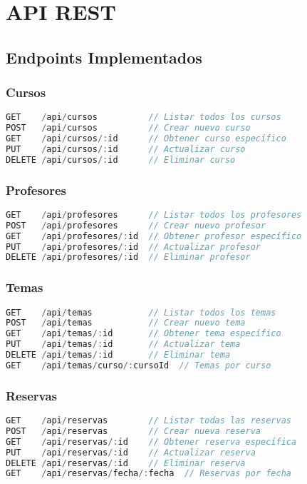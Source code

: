 \documentclass[12pt,a4paper]{article}
\begin{document}
\section{API REST}

\subsection{Endpoints Implementados}

\subsubsection{Cursos}
\begin{lstlisting}[language=JavaScript]
GET    /api/cursos          // Listar todos los cursos
POST   /api/cursos          // Crear nuevo curso
GET    /api/cursos/:id      // Obtener curso específico
PUT    /api/cursos/:id      // Actualizar curso
DELETE /api/cursos/:id      // Eliminar curso
\end{lstlisting}

\subsubsection{Profesores}
\begin{lstlisting}[language=JavaScript]
GET    /api/profesores      // Listar todos los profesores
POST   /api/profesores      // Crear nuevo profesor
GET    /api/profesores/:id  // Obtener profesor específico
PUT    /api/profesores/:id  // Actualizar profesor
DELETE /api/profesores/:id  // Eliminar profesor
\end{lstlisting}

\subsubsection{Temas}
\begin{lstlisting}[language=JavaScript]
GET    /api/temas           // Listar todos los temas
POST   /api/temas           // Crear nuevo tema
GET    /api/temas/:id       // Obtener tema específico
PUT    /api/temas/:id       // Actualizar tema
DELETE /api/temas/:id       // Eliminar tema
GET    /api/temas/curso/:cursoId  // Temas por curso
\end{lstlisting}

\subsubsection{Reservas}
\begin{lstlisting}[language=JavaScript]
GET    /api/reservas        // Listar todas las reservas
POST   /api/reservas        // Crear nueva reserva
GET    /api/reservas/:id    // Obtener reserva específica
PUT    /api/reservas/:id    // Actualizar reserva
DELETE /api/reservas/:id    // Eliminar reserva
GET    /api/reservas/fecha/:fecha  // Reservas por fecha
\end{lstlisting}
\end{document}

